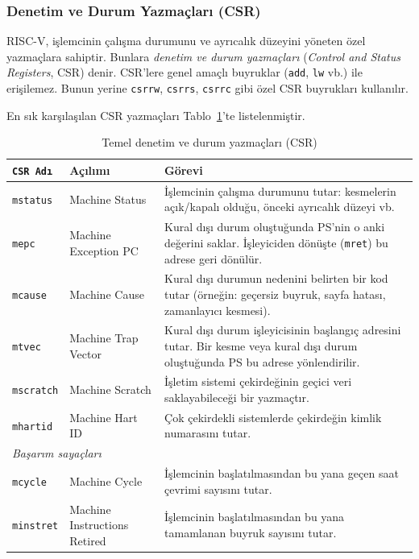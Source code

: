 \subsubsection{Denetim ve Durum Yazmaçları (CSR)}

RISC-V, işlemcinin çalışma durumunu ve ayrıcalık düzeyini yöneten özel yazmaçlara sahiptir. Bunlara \emph{denetim ve durum yazmaçları} (\emph{Control and Status Registers}, CSR) denir. CSR'lere genel amaçlı buyruklar (\texttt{add}, \texttt{lw} vb.) ile erişilemez. Bunun yerine \texttt{csrrw}, \texttt{csrrs}, \texttt{csrrc} gibi özel CSR buyrukları kullanılır.

En sık karşılaşılan CSR yazmaçları Tablo~\ref{tab:csr-yazmaclari}'te listelenmiştir.

\begin{table}[H]
\centering
\caption[Temel CSR yazmaçları]{Temel denetim ve durum yazmaçları (CSR)}
\label{tab:csr-yazmaclari}
\small
\begin{tabular}{llp{7.5cm}}
\toprule
\texttt{CSR Adı} & Açılımı & Görevi \\
\midrule
\texttt{mstatus}  & Machine Status      & İşlemcinin çalışma durumunu tutar: kesmelerin açık/kapalı olduğu, önceki ayrıcalık düzeyi vb. \\
\texttt{mepc}     & Machine Exception PC & Kural dışı durum oluştuğunda PS'nin o anki değerini saklar. İşleyiciden dönüşte (\texttt{mret}) bu adrese geri dönülür. \\
\texttt{mcause}   & Machine Cause        & Kural dışı durumun nedenini belirten bir kod tutar (örneğin: geçersiz buyruk, sayfa hatası, zamanlayıcı kesmesi). \\
\texttt{mtvec}    & Machine Trap Vector  & Kural dışı durum işleyicisinin başlangıç adresini tutar. Bir kesme veya kural dışı durum oluştuğunda PS bu adrese yönlendirilir. \\
\texttt{mscratch} & Machine Scratch      & İşletim sistemi çekirdeğinin geçici veri saklayabileceği bir yazmaçtır. \\
\texttt{mhartid}  & Machine Hart ID      & Çok çekirdekli sistemlerde çekirdeğin kimlik numarasını tutar. \\
\midrule
\multicolumn{3}{l}{\emph{Başarım sayaçları}} \\
\midrule
\texttt{mcycle}    & Machine Cycle        & İşlemcinin başlatılmasından bu yana geçen saat çevrimi sayısını tutar. \\
\texttt{minstret}  & Machine Instructions Retired & İşlemcinin başlatılmasından bu yana tamamlanan buyruk sayısını tutar. \\
\bottomrule
\end{tabular}
\end{table}


